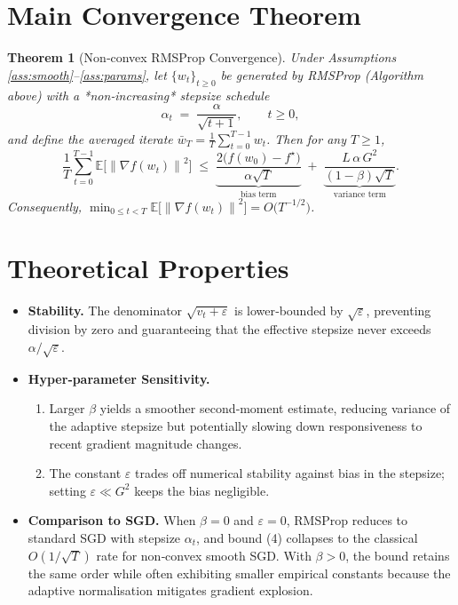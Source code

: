 \documentclass{article}
\newtheorem{theorem}{Theorem}
\newcommand{\E}{\mathbb{E}}
\newcommand{\norm}[1]{\left\lVert#1\right\rVert}
\begin{document}
\section*{Main Convergence Theorem}
\begin{theorem}[Non‑convex RMSProp Convergence]\label{thm:main}
Under Assumptions \ref{ass:smooth}–\ref{ass:params}, let $\{w_t\}_{t\ge0}$ be generated
by RMSProp (Algorithm above) with a *non‑increasing* stepsize schedule
\[
\alpha_t \;=\; \frac{\alpha}{\sqrt{t+1}} ,
\qquad t\ge0,
\tag{3}
\]
and define the averaged iterate $\bar w_T=\frac1T\sum_{t=0}^{T-1}w_t$.
Then for any $T\ge1$,
\[
\frac{1}{T}\sum_{t=0}^{T-1}
\E\bigl[\norm{\nabla f(w_t)}^2\bigr]
\;\le\;
\underbrace{\frac{2\bigl(f(w_0)-f^\star\bigr)}{\alpha\sqrt{T}}}_{\text{bias term}}
\;+\;
\underbrace{\frac{L\,\alpha\,G^2}{(1-\beta)\sqrt{T}}}_{\text{variance term}} .
\tag{4}
\]
Consequently, $\displaystyle\min_{0\le t<T}\E\!\bigl[\norm{\nabla f(w_t)}^2\bigr]=O\!\bigl(T^{-1/2}\bigr)$.
\end{theorem}

\section*{Theoretical Properties}
\begin{itemize}
\item \textbf{Stability.} The denominator $\sqrt{v_t+\varepsilon}$ is lower‑bounded by
$\sqrt{\varepsilon}$, preventing division by zero and guaranteeing that the
effective stepsize never exceeds $\alpha/\sqrt{\varepsilon}$.
\item \textbf{Hyper‑parameter Sensitivity.}
    \begin{enumerate}
        \item Larger $\beta$ yields a smoother second‑moment estimate, reducing
            variance of the adaptive stepsize but potentially slowing down
            responsiveness to recent gradient magnitude changes.
        \item The constant $\varepsilon$ trades off numerical stability
            against bias in the stepsize; setting $\varepsilon\ll G^2$ keeps the
            bias negligible.
    \end{enumerate}
\item \textbf{Comparison to SGD.}
When $\beta=0$ and $\varepsilon=0$, RMSProp reduces to standard SGD with
stepsize $\alpha_t$, and bound (4) collapses to the classical $O(1/\sqrt{T})$
rate for non‑convex smooth SGD.  With $\beta>0$, the bound retains the same
order while often exhibiting smaller empirical constants because the adaptive
normalisation mitigates gradient explosion.
\end{itemize}
\end{document}
